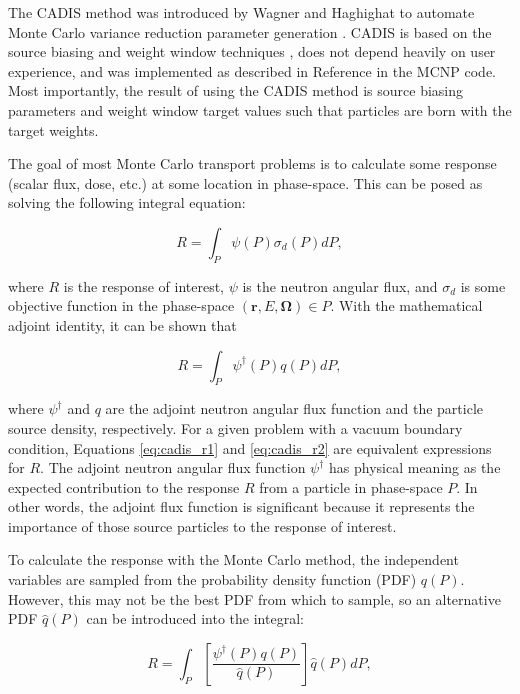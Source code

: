 \documentclass{article} %
\newcommand{\bo}{\mathbf\Omega}
\newcommand{\vecr}{\textbf{r}}
\newcommand{\qhat}{\ensuremath{\hat{q}}}
\begin{document}
The CADIS method was introduced by Wagner and Haghighat to automate Monte Carlo
variance reduction parameter generation \cite{cadis}. CADIS is based on the
source biasing and weight window techniques , does not depend heavily 
on user experience, and was implemented as described in Reference \cite{cadis}
in the MCNP \cite{mcnp} code. Most importantly, the result of using the CADIS
method is source biasing parameters and weight window target
values such that particles are born with the target weights.

The goal of most Monte Carlo transport problems is to calculate some response
(scalar flux, dose, etc.) at some location in phase-space. This can be posed as
solving the following integral equation:

\begin{equation}
R = \int_P \psi(P)\sigma_d(P)dP,
\label{eq:cadis_r1}
\end{equation}

\noindent where $R$ is the response of interest, $\psi$ is the neutron angular
flux, and $\sigma_d$ is some objective function in the phase-space
$(\vecr, E, \bo) \in P$. With the mathematical adjoint identity, it can be
shown that

\begin{equation}
R = \int_P \psi^{\dagger}(P)q(P)dP,
\label{eq:cadis_r2}
\end{equation}

\noindent where $\psi^{\dagger}$ and $q$ are the adjoint neutron angular flux
function and the particle source density, respectively. For a given problem
with a vacuum boundary condition, Equations \ref{eq:cadis_r1} and
\ref{eq:cadis_r2} are equivalent expressions for $R$. The adjoint neutron
angular flux function $\psi^{\dagger}$ has physical meaning as the expected
contribution to the response $R$ from a particle in phase-space $P$. In other
words, the adjoint flux function is significant because it represents the
importance of those source particles to the response of interest.

To calculate the response with the Monte Carlo method, the independent
variables are sampled from the probability density function (PDF) $q(P)$.
However, this may not be the best PDF from which to sample, so an alternative
PDF $\qhat(P)$ can be introduced into the integral:

\begin{equation}
R = \int_P \left[\frac{\psi^{\dagger}(P)q(P)}{\qhat(P)}\right]\qhat(P)dP,
\end{equation}
\end{document}
